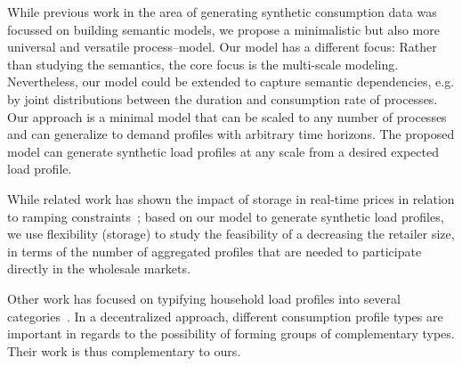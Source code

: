 \documentclass[conference]{IEEEtran}
\begin{document}
While previous work in the area of generating synthetic consumption data was focussed on building semantic models, we propose a minimalistic but also more universal and versatile process--model. Our model has a different focus: Rather than studying the semantics, the core focus is the multi-scale modeling. Nevertheless, our model could be extended to capture semantic dependencies, e.g.  by joint distributions between the duration and consumption rate of processes. Our approach is a minimal model that can be scaled to any number of processes and can generalize to demand profiles with arbitrary time horizons. The proposed model can generate synthetic load profiles at any scale from a desired expected load profile.

While related work has shown the impact of storage in real-time prices in relation to ramping constraints~\cite{gast2013impact, faghih2011optimal}; based on our model to generate synthetic load profiles, we use flexibility (storage) to study the feasibility of a decreasing the retailer size, in terms of the number of aggregated profiles that are needed to participate directly in the wholesale markets.

Other work has focused on typifying household load profiles into several categories~\cite{flath2012cluster,hayn2014electricity}. In a decentralized approach, different consumption profile types are important in regards to the possibility of forming groups of complementary types. Their work is thus complementary to ours.
\end{document}
